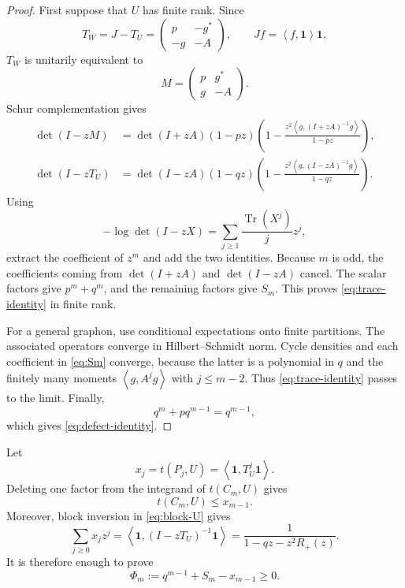 \documentclass[11pt]{article}
\numberwithin{equation}{section}
\newcommand{\one}{\mathbf 1}
\newcommand{\Tr}{\operatorname{Tr}}
\newcommand{\ip}[2]{\left\langle #1,#2\right\rangle}
\begin{document}
\begin{proof}
First suppose that $U$ has finite rank. Since
\[
        T_W=J-T_U=
        \begin{pmatrix}
          p&-g^*\\
          -g&-A
        \end{pmatrix},
        \qquad Jf=\ip{f}{\one}\one,
\]
$T_W$ is unitarily equivalent to
\[
        M=\begin{pmatrix}p&g^*\\ g&-A\end{pmatrix}.
\]
Schur complementation gives
\begin{align*}
 \det(I-zM)
 &=\det(I+zA)(1-pz)
   \left(1-\frac{z^2\ip{g}{(I+zA)^{-1}g}}{1-pz}\right),\\
 \det(I-zT_U)
 &=\det(I-zA)(1-qz)
   \left(1-\frac{z^2\ip{g}{(I-zA)^{-1}g}}{1-qz}\right).
\end{align*}
Using
\[
        -\log\det(I-zX)=\sum_{j\ge1}\frac{\Tr(X^j)}{j}z^j,
\]
extract the coefficient of $z^m$ and add the two identities. Because $m$ is odd, the coefficients coming from $\det(I+zA)$ and $\det(I-zA)$ cancel. The scalar factors give $p^m+q^m$, and the remaining factors give $S_m$. This proves \eqref{eq:trace-identity} in finite rank.

For a general graphon, use conditional expectations onto finite partitions. The associated operators converge in Hilbert--Schmidt norm. Cycle densities and each coefficient in \eqref{eq:Sm} converge, because the latter is a polynomial in $q$ and the finitely many moments $\ip{g}{A^jg}$ with $j\le m-2$. Thus \eqref{eq:trace-identity} passes to the limit. Finally,
\[
        q^m+pq^{m-1}=q^{m-1},
\]
which gives \eqref{eq:defect-identity}.
\end{proof}

Let
\[
        x_j=t(P_j,U)=\ip{\one}{T_U^j\one}.
\]
Deleting one factor from the integrand of $t(C_m,U)$ gives
\begin{equation}\label{eq:delete-edge}
        t(C_m,U)\le x_{m-1}.
\end{equation}
Moreover, block inversion in \eqref{eq:block-U} gives
\begin{equation}\label{eq:path-generating}
        \sum_{j\ge0}x_jz^j
        =\ip{\one}{(I-zT_U)^{-1}\one}
        =\frac{1}{1-qz-z^2R_+(z)}.
\end{equation}
It is therefore enough to prove
\begin{equation}\label{eq:Phi-def}
        \Phi_m:=q^{m-1}+S_m-x_{m-1}\ge0.
\end{equation}
\end{document}
